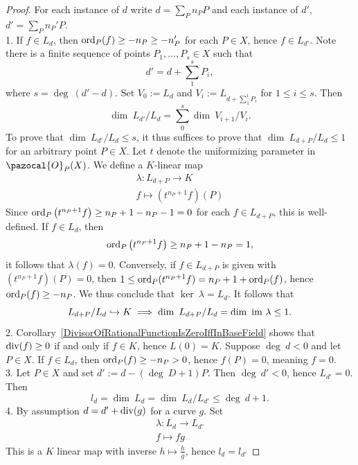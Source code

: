     \begin{proof}
        For each instance of $d$ write $d= \sum_P n_P P$ and each instance of $d'$, $d' = \sum_P n_P'P$.\\
        1. If $f\in L_d$, then $\mathrm{ord}_P(f) \geq -n_P\geq -n_P'$ for each $P\in X$, hence $f\in L_{d'}$. Note there is a finite sequence of points $P_1,\dots,P_s\in X$ such that 
        $$
            d' = d+\sum_1^s P_i,
        $$
        where $s = \deg \ (d'-d)$. Set $V_0 := L_d$ and $V_i := L_{d+\sum_1^i P_i}$ for $1\leq i\leq s$. Then 
        $$
            \dim \ L_{d'}/L_{d} = \sum_0^s \dim\ V_{i+1}/V_i.
        $$
        To prove that $\dim \ L_{d'}/L_d \leq s $, it thus suffices to prove that $\dim \ L_{d+P}/L_d\leq 1$ for an arbitrary point $P\in X$. Let $t$ denote the uniformizing parameter in $\pazocal{O}_P(X)$. We define a $K$-linear map 
        \begin{gather*}
            \lambda : L_{d+P}\rightarrow K\\
            f\mapsto (t^{n_P+1}f)(P)
        \end{gather*} 
        Since $\mathrm{ord}_P\left(t^{n_P+1}f\right) \geq n_P+1-n_P-1=0$ for each $f\in L_{d+P}$, this is well-defined. If $f\in L_d$, then 
        $$
            \mathrm{ord}_P\left(t^{n_P+1}f\right)\geq n_P+1-n_P=1,
        $$
        it follows that $\lambda(f)=0$. Conversely, if $f\in L_{d+P}$ is given with $(t^{n_P+1}f)(P)=0$, then $1\leq \mathrm{ord}_P(t^{n_P+1}f) = n_P+1+\mathrm{ord}_P(f)$, hence $\mathrm{ord}_P(f) \geq -n_P$. We thus conclude that $\ker \ \lambda = L_d$. It follows that 
        $$
            L_{d+P}/L_d \hookrightarrow K \implies \dim \ L_{d+P}/L_d = \dim \ \mathrm{im} \ \lambda \leq 1.
        $$
        2. Corollary~\ref{DivisorOfRationalFunctionIsZeroIffInBaseField} shows that $\mathrm{div}(f)\geq 0$ if and only if $f\in K$, hence $L(0) = K$. Suppose $\deg \ d <0$ and let $P\in X$. If $f\in L_d$, then $\mathrm{ord}_P(f)\geq -n_P>0$, hence $f(P)=0$, meaning $f=0$.\\
        3. Let $P\in X$ and set $d' := d - (\deg \ D+1)P$. Then $\deg \ d' < 0$, hence $L_{d'}=0$. Then
        $$
            l_d = \dim \ L_d = \dim \ L_d/L_{d'} \leq \deg \ d +1.
        $$
        4. By assumption $d = d' + \mathrm{div}(g)$ for a curve $g$. Set 
        \begin{gather*}
            \lambda : L_d \rightarrow L_{d'}\\
            f\mapsto fg
        \end{gather*}
        This is a $K$ linear map with inverse $h\mapsto \frac{h}{g}$, hence $l_d = l_{d'}$ 
    \end{proof}
